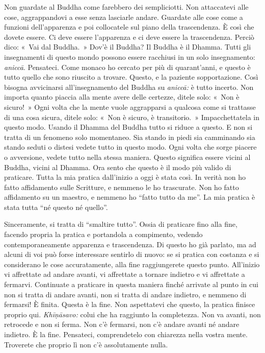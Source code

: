 Non guardate al Buddha come farebbero dei sempliciotti. Non attaccatevi
alle cose, aggrappandovi a esse senza lasciarle andare. Guardate alle
cose come a funzioni dell'apparenza e poi collocatele sul piano della
trascendenza. È così che dovete essere. Ci deve essere l'apparenza e ci
deve essere la trascendenza. Perciò dico: «~Vai dal Buddha.~» Dov'è il
Buddha? Il Buddha è il Dhamma. Tutti gli insegnamenti di questo mondo
possono essere racchiusi in un solo insegnamento: \emph{aniccā}.
Pensateci. Come monaco ho cercato per più di quarant'anni, e questo è
tutto quello che sono riuscito a trovare. Questo, e la paziente
sopportazione. Così bisogna avvicinarsi all'insegnamento del Buddha su
\emph{aniccā:} è tutto incerto. Non importa quanto piaccia alla mente
avere delle certezze, ditele solo: «~Non è sicuro!~» Ogni volta che la
mente vuole aggrapparsi a qualcosa come si trattasse di una cosa sicura,
ditele solo: «~Non è sicuro, è transitorio.~» Impacchettatela in questo
modo. Usando il Dhamma del Buddha tutto si riduce a questo. E non si
tratta di un fenomeno solo momentaneo. Sia stando in piedi sia
camminando sia stando seduti o distesi vedete tutto in questo modo. Ogni
volta che sorge piacere o avversione, vedete tutto nella stessa maniera.
Questo significa essere vicini al Buddha, vicini al Dhamma. Ora sento
che questo è il modo più valido di praticare. Tutta la mia pratica
dall'inizio a oggi è stata così. In verità non ho fatto affidamento
sulle Scritture, e nemmeno le ho trascurate. Non ho fatto affidamento su
un maestro, e nemmeno ho ``fatto tutto da me''. La mia pratica è stata
tutta ``né questo né quello''.

Sinceramente, si tratta di ``smaltire tutto''. Ossia di praticare fino
alla fine, facendo propria la pratica e portandola a compimento, vedendo
contemporaneamente apparenza e trascendenza. Di questo ho già parlato,
ma ad alcuni di voi può forse interessare sentirlo di nuovo: se si
pratica con costanza e si considerano le cose accuratamente, alla fine
raggiungerete questo punto. All'inizio vi affrettate ad andare avanti,
vi affrettate a tornare indietro e vi affrettate a fermarvi. Continuate
a praticare in questa maniera finché arrivate al punto in cui non si
tratta di andare avanti, non si tratta di andare indietro, e nemmeno di
fermarsi! È finita. Questa è la fine. Non aspettatevi che questo, la
pratica finisce proprio qui. \emph{Khīṇāsavo:} colui che ha raggiunto la
completezza. Non va avanti, non retrocede e non si ferma. Non c'è
fermarsi, non c'è andare avanti né andare indietro. È la fine.
Pensateci, comprendetelo con chiarezza nella vostra mente. Troverete che
proprio lì non c'è assolutamente nulla.

